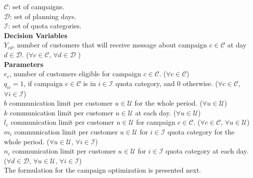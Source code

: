 \documentclass[11pt]{article}
\begin{document}
\noindent ${\mathcal{C}}$: set of campaigns. \\
\noindent ${\mathcal{D}}$: set of planning days. \\
\noindent ${\mathcal{I}}$: set of quota categories. \\

\noindent \textbf{Decision Variables}\\

\noindent $Y_{{c}{d}}$, number of customers that will receive message about campaign $c \in \mathcal{C}$ at day $d \in \mathcal{D}$.
($\forall c \in \mathcal{C}$, $\forall d \in \mathcal{D}$ )\\

\noindent \textbf{Parameters}\\

\noindent $e_{c}$, number of customers eligible for campaign $c \in \mathcal{C}$.
($\forall c \in \mathcal{C}$)\\

\noindent $q_{{i}{c}}=1$, if campaign $c \in \mathcal{C}$ is in $i \in \mathcal{I}$ quota category, and 0 otherwise.
($\forall c \in \mathcal{C}$, $\forall i \in \mathcal{I}$)\\

\noindent $b$ communication limit per customer $u \in \mathcal{U}$ for the whole period.
($\forall u \in \mathcal{U}$)\\

\noindent $k$ communication limit per customer $u \in \mathcal{U}$ at each day.
($\forall u \in \mathcal{U}$)\\

\noindent $l_{c}$ communication limit per customer $u \in \mathcal{U}$ for campaign $c \in \mathcal{C}$.
($\forall c \in \mathcal{C}$, $\forall u \in \mathcal{U}$)\\

\noindent $m_{i}$ communication limit per customer $u \in \mathcal{U}$ for $i \in \mathcal{I}$ quota category for the whole period.
($\forall u \in \mathcal{U}$, $\forall i \in \mathcal{I}$)\\

\noindent $n_{i}$ communication limit per customer $u \in \mathcal{U}$ for $i \in \mathcal{I}$ quota category at each day.
($\forall d \in \mathcal{D}$, $\forall u \in \mathcal{U}$, $\forall i \in \mathcal{I}$)\\

\noindent The formulation for the campaign optimization is presented next.
\end{document}
